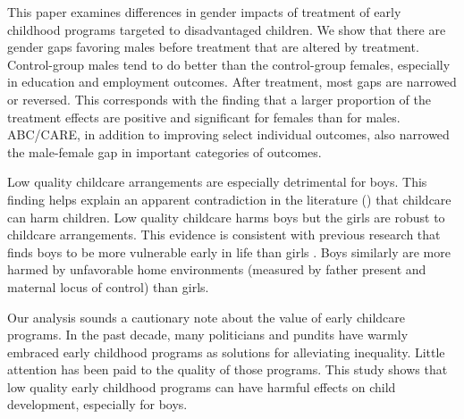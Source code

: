 This paper examines differences in gender impacts of treatment of early childhood programs targeted to disadvantaged children. We show that there are gender gaps favoring males before treatment that are altered by treatment. Control-group males tend to do better than the control-group females, especially in education and employment outcomes. After treatment, most gaps are narrowed or reversed. This corresponds with the finding that a larger proportion of the treatment effects are positive and significant for females than for males. ABC/CARE, in addition to improving select individual outcomes, also narrowed the male-female gap in important categories of outcomes.

Low quality childcare arrangements are especially detrimental for boys. This finding helps explain an apparent contradiction in the literature (\citet{Baker_Gruber_etal_2008_JPE,Baker_Gruber_Milligan_2015_Noncog_Defects,Kottelenberg-Lehrer_2014_Gender-Effects}) that childcare can harm children. Low quality childcare harms boys but the girls are robust to childcare arrangements. This evidence is consistent with previous research that finds boys to be more vulnerable early in life than girls \citep{golding2016psychology}. Boys similarly are more harmed by unfavorable home environments (measured by father present and maternal locus of control) than girls.

Our analysis sounds a cautionary note about the value of early childcare programs. In the past decade, many politicians and pundits have warmly embraced early childhood programs as solutions for alleviating inequality. Little attention has been paid to the quality of those programs. This study shows that low quality early childhood programs can have harmful effects on child development, especially for boys.

